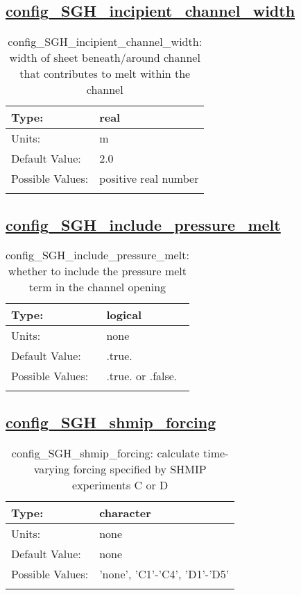 \subsection[config\_SGH\_incipient\_channel\_width]{\hyperref[sec:nm_tab_subglacial_hydro]{config\_SGH\_incipient\_channel\_width}}
\label{subsec:nm_sec_config_SGH_incipient_channel_width}
\begin{center}
\begin{longtable}{| p{2.0in} || p{4.0in} |}
    \hline
    Type: & real \\
    \hline
    Units: & \si{m} \\
    \hline
    Default Value: & 2.0 \\
    \hline
    Possible Values: & positive real number \\
    \hline
    \caption{config\_SGH\_incipient\_channel\_width: width of sheet beneath/around channel that contributes to melt within the channel}
\end{longtable}
\end{center}
\subsection[config\_SGH\_include\_pressure\_melt]{\hyperref[sec:nm_tab_subglacial_hydro]{config\_SGH\_include\_pressure\_melt}}
\label{subsec:nm_sec_config_SGH_include_pressure_melt}
\begin{center}
\begin{longtable}{| p{2.0in} || p{4.0in} |}
    \hline
    Type: & logical \\
    \hline
    Units: & \si{none} \\
    \hline
    Default Value: & .true. \\
    \hline
    Possible Values: & .true. or .false. \\
    \hline
    \caption{config\_SGH\_include\_pressure\_melt: whether to include the pressure melt term in the channel opening}
\end{longtable}
\end{center}
\subsection[config\_SGH\_shmip\_forcing]{\hyperref[sec:nm_tab_subglacial_hydro]{config\_SGH\_shmip\_forcing}}
\label{subsec:nm_sec_config_SGH_shmip_forcing}
\begin{center}
\begin{longtable}{| p{2.0in} || p{4.0in} |}
    \hline
    Type: & character \\
    \hline
    Units: & \si{none} \\
    \hline
    Default Value: & none \\
    \hline
    Possible Values: & 'none', 'C1'-'C4', 'D1'-'D5' \\
    \hline
    \caption{config\_SGH\_shmip\_forcing: calculate time-varying forcing specified by SHMIP experiments C or D}
\end{longtable}
\end{center}
